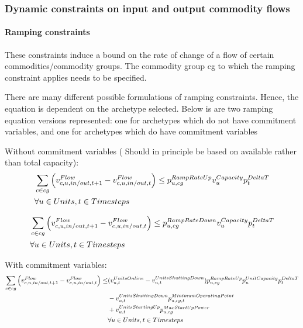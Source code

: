 \subsubsection{Dynamic constraints on input and output commodity flows}
\paragraph{Ramping constraints} These constraints induce a bound on the rate of change of a flow of certain commodities/commodity groups. The commodity group cg to which the ramping constraint applies needs to be specified.

There are many different possible formulations of ramping constraints. Hence, the equation is dependent on the archetype selected. Below is are two ramping equation versions represented: one for archetypes which do not have commitment variables, and one for archetypes which do have commitment variables

Without commitment variables ({\color{red} Should in principle be based on available rather than total capacity}):
\begin{align} \label{eq:updwardrampingconstraintwithoutcommitmentvariables}
&\sum_{\commodity \in cg} \Big( \vFlow[\commodity,\unit,in/out,\timestep+1] - \vFlow \Big) \le \pRampRateUp \vCapacity \pDeltaT \nonumber \\
&\forall \units, \timesteps
\end{align}

\begin{align} \label{eq:downdwardrampingconstraintwithoutcommitmentvariables}
&\sum_{\commodity \in cg} \Big( \vFlow[\commodity,\unit,in/out,\timestep+1] - \vFlow \Big) \le \pRampRateDown \vCapacity \pDeltaT\nonumber \\
& \forall \units, \timesteps
\end{align}



With commitment variables:
\begin{align} \label{eq:updwardrampingconstraintwithcommitmentvariables}
\sum_{\commodity \in cg} \Big( \vFlow[\commodity,\unit,in/out,\timestep+1] - \vFlow \Big) \le & (\vUnitsOnline-\vUnitsShuttingDown) \pRampRateUp \pUnitCapacity \pDeltaT \nonumber \\
& - \vUnitsShuttingDown \pMinimumOperatingPoint \nonumber \\
& +\vUnitsStartingUp \pMaxStartUpPower \nonumber \\
& \forall \units, \timesteps
\end{align}

